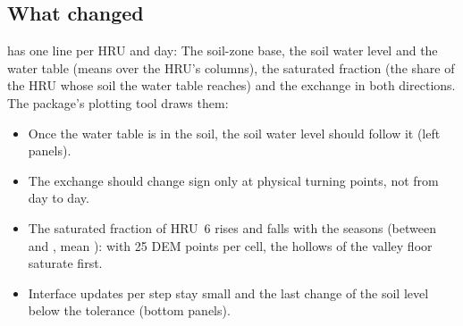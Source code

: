\subsection{What changed}
 has one line per HRU and day:
The soil-zone base, the soil water level and the water table (means over the HRU's columns), the saturated fraction (the
share of the HRU whose soil the water table reaches) and the exchange in both directions. The package's plotting tool
draws them:
\begin{tocheck}
\begin{itemize}
\item Once the water table is in the soil, the soil water level should follow it (left panels).
\item The exchange should change sign only at physical turning points, not from day to day.
\item The saturated fraction of HRU~6 rises and falls with the seasons (between  and , mean
      ): with 25 DEM points per cell, the hollows of the valley floor saturate first.
\item Interface updates per step stay small and the last change of the soil level below the tolerance (bottom panels).
\end{itemize}
\end{tocheck}

